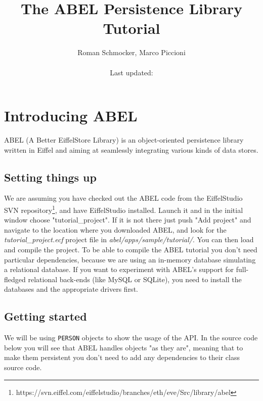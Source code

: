 \documentclass[a4paper,12pt]{report}
\title {The ABEL Persistence Library Tutorial}
\author {
	Roman Schmocker, Marco Piccioni\\\\
	Last updated:
}
\newcommand{\blankpage}{
\newpage
\thispagestyle{empty}
\mbox{}
\newpage
}
\begin{document}
\maketitle


%


\tableofcontents



%

\chapter{Introducing ABEL}
ABEL (A Better EiffelStore Library) is an object-oriented persistence library written in Eiffel and aiming at seamlessly integrating various kinds of data stores.
 
\section{Setting things up}
We are assuming you have checked out the ABEL code from the EiffelStudio SVN repository\footnote{https://svn.eiffel.com/eiffelstudio/branches/eth/eve/Src/library/abel}, and have EiffelStudio installed. Launch it and in the initial window choose "tutorial\_project". If it is not there just push "Add project" and navigate to the location where you downloaded ABEL, and look for the \emph{tutorial\_project.ecf} project file in \emph{abel/apps/sample/tutorial/}. You can then load and compile the project. To be able to compile the ABEL tutorial you don't need particular dependencies, because we are using an in-memory database simulating a relational database. If you want to experiment with ABEL's support for full-fledged relational back-ends (like MySQL or SQLite), you need to install the databases and the appropriate drivers first.

\section{Getting started}
We will be using \lstinline!PERSON! objects to show the usage of the API. 
In the source code below you will see that ABEL handles objects "as they are", meaning that to make them persistent you don't need to add any dependencies to their class source code.
\end{document}
